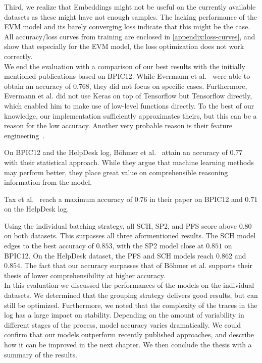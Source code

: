 Third, we realize that Embeddings might not be useful on the currently available datasets as these might have not enough samples. The lacking performance of the EVM model and its barely converging loss indicate that this might be the case. All accuracy/loss curves from training are enclosed in \autoref{appendix:loss-curves}, and show that especially for the EVM model, the loss optimization does not work correctly.\\

We end the evaluation with a comparison of our best results with the initially mentioned publications based on BPIC12. While Evermann et al.~\cite{evermann2016} were able to obtain an accuracy of $0.768$, they did not focus on specific cases. Furthermore, Evermann et al. did not use Keras on top of Tensorflow but Tensorflow directly, which enabled him to make use of low-level functions directly. To the best of our knowledge, our implementation sufficiently approximates theirs, but this can be a reason for the low accuracy. Another very probable reason is their feature engineering~\cite{evermann2016}.

On BPIC12 and the HelpDesk log, Böhmer et al.~\cite{boehmer2018probability} attain an accuracy of $0.77$ with their statistical approach. While they argue that machine learning methods may perform better, they place great value on comprehensible reasoning information from the model.

Tax et al.~\cite{tax2017} reach a maximum accuracy of $0.76$ in their paper on BPIC12 and $0.71$ on the HelpDesk log.

Using the individual batching strategy, all SCH, SP2, and PFS score above $0.80$ on both datasets.
This surpasses all three aformentioned results.
The SCH model edges to the best accuracy of $0.853$, with the SP2 model close at $0.851$ on BPIC12.
On the HelpDesk dataset, the PFS and SCH models reach $0.862$ and $0.854$.
The fact that our accuracy surpasses that of Böhmer et al. supports their thesis of lower comprehensibility at higher accuracy.\\

In this evaluation we discussed the performances of the models on the individual datasets.
We determined that the grouping strategy delivers good results, but can still be optimized.
Furthermore, we noted that the complexity of the traces in the log has a large impact on stability.
Depending on the amount of variability in different stages of the process, model accuracy varies dramatically.
We could confirm that our models outperform recently published approaches, and describe how it can be improved in the next chapter.
We then conclude the thesis with a summary of the results.

